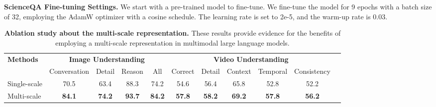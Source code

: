 \documentclass[10pt,twocolumn,letterpaper]{article}
\newcommand{\myparagraph}[1]{\textbf{#1}\hspace{1.8ex}}
\begin{document}
\noindent \myparagraph{ScienceQA Fine-tuning Settings.} We start with a pre-trained model to fine-tune. We fine-tune the model for 9 epochs with a batch size of 32, employing the AdamW optimizer with a cosine schedule. The learning rate is set to 2e-5, and the warm-up rate is 0.03. 

\begin{table*}[t]
\centering
{
\begin{tabular}{lcccccccccc}
\toprule[.9pt]
\multirow{2}{*}{\textbf{Methods}} & \multicolumn{4}{c}{\textbf{Image Understanding}}  & \multicolumn{5}{c}{\textbf{Video Understanding}} \\
\cmidrule(rl){2-5} \cmidrule(rl){6-10}
& {Conversation} & {Detail} & {Reason} & {All} & {Correct} & {Detail} & {Context} & {Temporal} & {{Consistency}} 
 \\ \midrule
 Single-scale & 70.5 & 63.4 & 88.3 & 74.2 & 54.6 & 56.4 & 65.8 & 52.8 & 52.2 \\ \midrule
 \rowcolor{aliceblue!60} Multi-scale & \bf{84.1} & \bf{74.2} & \bf{93.7} & \bf{84.2} & \bf{57.8} & \bf{58.2} & \bf{69.2} & \bf{57.8} & \bf{56.2}  \\
\bottomrule[.9pt]
\end{tabular}
\vspace{-.4em}
\caption{\textbf{Ablation study about the multi-scale representation.} These results provide evidence for the benefits of employing a multi-scale representation in multimodal large language models.}
\label{tab:ab_multi}
}
\end{table*}
\end{document}
